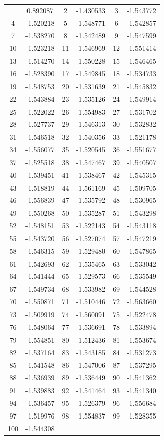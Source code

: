 \documentclass[12pt]{article}
\begin{document}
\begin{longtable}{@{}cc|cc|cc@{}}
\bottomrule
\endlastfoot
1 & 0.892087 & 2 & -1.430533 & 3 & -1.543772 \\
4 & -1.520218 & 5 & -1.548771 & 6 & -1.542857 \\
7 & -1.538270 & 8 & -1.542489 & 9 & -1.547599 \\
10 & -1.523218 & 11 & -1.546969 & 12 & -1.551414 \\
13 & -1.514270 & 14 & -1.550228 & 15 & -1.546465 \\
16 & -1.528390 & 17 & -1.549845 & 18 & -1.534733 \\
19 & -1.548753 & 20 & -1.531639 & 21 & -1.545832 \\
22 & -1.543884 & 23 & -1.535126 & 24 & -1.549914 \\
25 & -1.522022 & 26 & -1.554983 & 27 & -1.531702 \\
28 & -1.527737 & 29 & -1.546313 & 30 & -1.532832 \\
31 & -1.546518 & 32 & -1.540356 & 33 & -1.521178 \\
34 & -1.556077 & 35 & -1.520545 & 36 & -1.551677 \\
37 & -1.525518 & 38 & -1.547467 & 39 & -1.540507 \\
40 & -1.539451 & 41 & -1.538467 & 42 & -1.545315 \\
43 & -1.518819 & 44 & -1.561169 & 45 & -1.509705 \\
46 & -1.556839 & 47 & -1.535792 & 48 & -1.530965 \\
49 & -1.550268 & 50 & -1.535287 & 51 & -1.543298 \\
52 & -1.548151 & 53 & -1.522143 & 54 & -1.543118 \\
55 & -1.543720 & 56 & -1.527074 & 57 & -1.547219 \\
58 & -1.546315 & 59 & -1.529480 & 60 & -1.547865 \\
61 & -1.542693 & 62 & -1.535465 & 63 & -1.533042 \\
64 & -1.541444 & 65 & -1.529573 & 66 & -1.535549 \\
67 & -1.549734 & 68 & -1.533982 & 69 & -1.544528 \\
70 & -1.550871 & 71 & -1.510446 & 72 & -1.563660 \\
73 & -1.509919 & 74 & -1.560091 & 75 & -1.522478 \\
76 & -1.548064 & 77 & -1.536691 & 78 & -1.533894 \\
79 & -1.554851 & 80 & -1.512436 & 81 & -1.553674 \\
82 & -1.537164 & 83 & -1.543185 & 84 & -1.531273 \\
85 & -1.541548 & 86 & -1.547006 & 87 & -1.537295 \\
88 & -1.536939 & 89 & -1.536449 & 90 & -1.541362 \\
91 & -1.539883 & 92 & -1.541464 & 93 & -1.541340 \\
94 & -1.536457 & 95 & -1.526379 & 96 & -1.556684 \\
97 & -1.519976 & 98 & -1.554837 & 99 & -1.528355 \\
100 & -1.544308 &  &  &  &  \\

\end{longtable}
\end{document}
